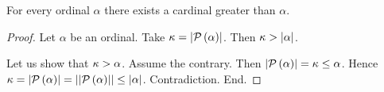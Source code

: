 \documentclass[../set-theory.tex]{subfiles}
\begin{document}
  \begin{forthel}
    \begin{theorem}
      For every ordinal $\alpha$ there exists a cardinal greater than $\alpha$.
    \end{theorem}
    \begin{proof}
      Let $\alpha$ be an ordinal.
      Take $\kappa = \left\vert\mathcal{P}\left(\alpha\right)\right\vert$.
      Then $\kappa > \left\vert\alpha\right\vert$.

      Let us show that $\kappa > \alpha$.
        Assume the contrary.
        Then $\left\vert\mathcal{P}\left(\alpha\right)\right\vert
          = \kappa
          \leq \alpha$.
        Hence $\kappa
          = \left\vert\mathcal{P}\left(\alpha\right)\right\vert
          = \left\vert\left\vert\mathcal{P}\left(\alpha\right)\right\vert\right\vert
          \leq \left\vert\alpha\right\vert$.
        Contradiction.
      End.
    \end{proof}
  \end{forthel}
\end{document}
